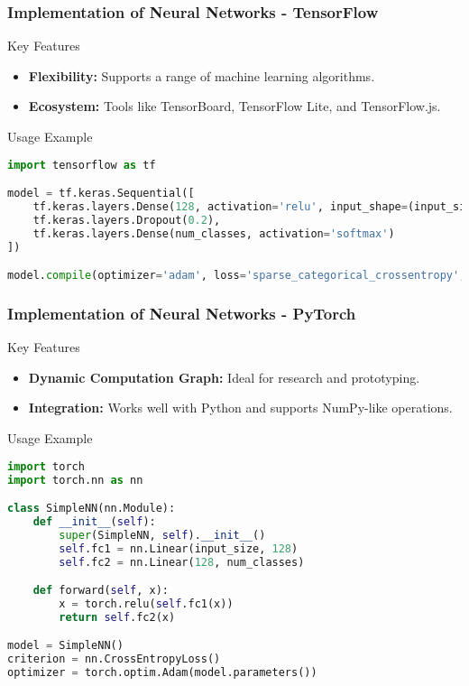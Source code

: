 \documentclass[aspectratio=169]{beamer}
\begin{document}
\begin{frame}[fragile]
    \frametitle{Implementation of Neural Networks - TensorFlow}
    \begin{block}{Key Features}
        \begin{itemize}
            \item \textbf{Flexibility:} Supports a range of machine learning algorithms.
            \item \textbf{Ecosystem:} Tools like TensorBoard, TensorFlow Lite, and TensorFlow.js.
        \end{itemize}
    \end{block}
    
    \begin{block}{Usage Example}
        \begin{lstlisting}[language=Python]
import tensorflow as tf

model = tf.keras.Sequential([
    tf.keras.layers.Dense(128, activation='relu', input_shape=(input_size,)),
    tf.keras.layers.Dropout(0.2),
    tf.keras.layers.Dense(num_classes, activation='softmax')
])

model.compile(optimizer='adam', loss='sparse_categorical_crossentropy', metrics=['accuracy'])
        \end{lstlisting}
    \end{block}
\end{frame}

\begin{frame}[fragile]
    \frametitle{Implementation of Neural Networks - PyTorch}
    \begin{block}{Key Features}
        \begin{itemize}
            \item \textbf{Dynamic Computation Graph:} Ideal for research and prototyping.
            \item \textbf{Integration:} Works well with Python and supports NumPy-like operations.
        \end{itemize}
    \end{block}
    
    \begin{block}{Usage Example}
        \begin{lstlisting}[language=Python]
import torch
import torch.nn as nn

class SimpleNN(nn.Module):
    def __init__(self):
        super(SimpleNN, self).__init__()
        self.fc1 = nn.Linear(input_size, 128)
        self.fc2 = nn.Linear(128, num_classes)

    def forward(self, x):
        x = torch.relu(self.fc1(x))
        return self.fc2(x)

model = SimpleNN()
criterion = nn.CrossEntropyLoss()
optimizer = torch.optim.Adam(model.parameters())
        \end{lstlisting}
    \end{block}
\end{frame}
\end{document}
